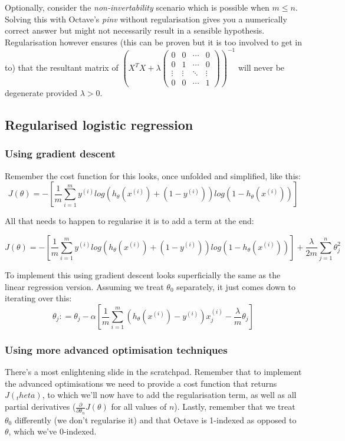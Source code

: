 Optionally, consider the \emph{non-invertability} scenario which is possible when $m \leq n$. Solving this with Octave's \emph{pinv} without regularisation gives you a numerically correct answer but might not necessarily result in a sensible hypothesis. Regularisation however ensures (this can be proven but it is too involved to get in to) that the resultant matrix of $(X^TX + \lambda
\begin{pmatrix}
0 & 0 & \cdots & 0 \\
0 & 1 & \cdots & 0 \\ 
\vdots & \vdots & \ddots & \vdots \\
0 & 0 & \cdots & 1
\end{pmatrix}
)^{-1}$ will never be degenerate provided $\lambda > 0$.

\subsection{Regularised logistic regression}
\subsubsection{Using gradient descent}
Remember the cost function for this looks, once unfolded and simplified, like this:
\[
	J(\theta) = -[\frac{1}{m}\sum^m_{i = 1}
	y^{(i)}log(h_\theta(x^{(i)}) + (1-y^{(i)}))log(1-h_\theta(x^{(i)}))]
\]

All that needs to happen to regularise it is to add a term at the end:

\[
J(\theta) = -[\frac{1}{m}\sum^m_{i = 1}
y^{(i)}log(h_\theta(x^{(i)}) + (1-y^{(i)}))log(1-h_\theta(x^{(i)}))] + \frac{\lambda}{2m}\sum^n_{j = 1}\theta^2_j
\]

To implement this using gradient descent looks superficially the same as the linear regression version. Assuming we treat $\theta_0$ separately, it just comes down to iterating over this:
\[
\theta_j \mathrel{\mathop:}=
\theta_j - \alpha [\frac{1}{m}
\sum_{i=1}^{m}
(h_\theta(x^{(i)}) - y^{(i)})x_j^{(i)} - \frac{\lambda}{m}\theta_j]
\]

\subsubsection{Using more advanced optimisation techniques}
There's a most enlightening slide in the scratchpad. Remember that to implement the advanced optimisations we need to provide a cost function that returns $J(_theta)$, to which we'll now have to add the regularisation term, as well as all partial derivatives ($\frac{\partial}{\partial\theta_n}J(\theta)$ for all values of $n$). Lastly, remember that we treat $\theta_0$ differently (we don't regularise it) and that Octave is 1-indexed as opposed to $\theta$, which we've 0-indexed.